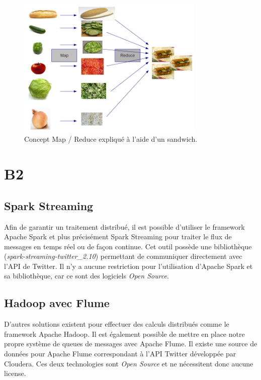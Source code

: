   \begin{figure}
    \centering
    \includegraphics[width=0.8\textwidth]{images/mapreduce.png}
    \caption{Concept Map / Reduce expliqué à l'aide d'un sandwich.}
    \label{mapreduce}
  \end{figure}


\section{B2}
\label{sec:B2}
  \subsection{Spark Streaming}
  Afin de garantir un traitement distribué, il est possible d'utiliser le framework Apache Spark et plus précisément Spark Streaming pour traiter le flux de messages en temps réel ou de façon continue. Cet outil possède une bibliothèque (\emph{spark-streaming-twitter\_2.10}) permettant de communiquer directement avec l'API de Twitter. Il n'y a aucune restriction pour l'utilisation d'Apache Spark et sa bibliothèque, car ce sont des logiciels \emph{Open Source}.

  \subsection{Hadoop avec Flume}
  \label{sub:Hadoop avec Flume}
  D'autres solutions existent pour effectuer des calculs distribués comme le framework Apache Hadoop. Il est également possible de mettre en place notre propre système de queues de messages avec Apache Flume. Il existe une source de données pour Apache Flume correspondant à l'API Twitter développée par Cloudera. Ces deux technologies sont \emph{Open Source} et ne nécessitent donc aucune license.

